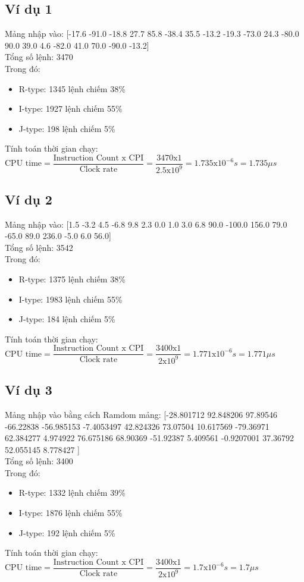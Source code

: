 \documentclass[a4paper]{article}
\begin{document}
\subsection{Ví dụ 1}
Mảng nhập vào: [-17.6 -91.0 -18.8 27.7 85.8 -38.4 35.5 -13.2 -19.3 -73.0 24.3 -80.0 90.0 39.0 4.6 -82.0 41.0 70.0 -90.0 -13.2]\\
Tổng số lệnh: 3470\\
Trong đó:
\begin{itemize}
	\item R-type: 1345 lệnh chiếm 38\%
	\item I-type: 1927 lệnh chiếm 55\%
	\item J-type: 198 lệnh chiếm 5\%
\end{itemize}
Tính toán thời gian chạy:\\
$\text{CPU time} = \dfrac{\text{Instruction Count x CPI}}{\text{Clock rate}} = \dfrac{3470\text{x}1}{2.5\text{x}10^9} = 1.735 \text{x}10^{-6} s = 1.735 \mu s$
\subsection{Ví dụ 2}
Mảng nhập vào: [1.5 -3.2 4.5 -6.8 9.8 2.3 0.0 1.0 3.0 6.8 90.0 -100.0 156.0 79.0 -65.0 89.0 236.0 -5.0 6.0 56.0]\\
Tổng số lệnh: 3542\\
Trong đó:
\begin{itemize}
	\item R-type: 1375 lệnh chiếm 38\%
	\item I-type: 1983 lệnh chiếm 55\%
	\item J-type: 184 lệnh chiếm 5\%
\end{itemize}
Tính toán thời gian chạy:\\
$\text{CPU time} = \dfrac{\text{Instruction Count x CPI}}{\text{Clock rate}} = \dfrac{3400\text{x}1}{2\text{x}10^9} = 1.771 \text{x}10^{-6} s = 1.771 \mu s$
\subsection{Ví dụ 3}
Mảng nhập vào bằng cách Ramdom mảng: [-28.801712 92.848206 97.89546 -66.22838 -56.985153 -7.4053497 42.824326 73.07504 10.617569 -79.36971 62.384277 4.974922 76.675186 68.90369 -51.92387 5.409561 -0.9207001 37.36792 52.055145 8.778427 ]\\
Tổng số lệnh: 3400\\
Trong đó:
\begin{itemize}
	\item R-type: 1332 lệnh chiếm 39\%
	\item I-type: 1876 lệnh chiếm 55\%
	\item J-type: 192 lệnh chiếm 5\%
\end{itemize}
Tính toán thời gian chạy:\\
$\text{CPU time} = \dfrac{\text{Instruction Count x CPI}}{\text{Clock rate}} = \dfrac{3400\text{x}1}{2\text{x}10^9} = 1.7 \text{x}10^{-6} s = 1.7 \mu s$
\end{document}
